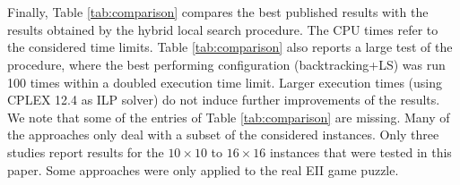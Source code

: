 \documentclass[preprint,12pt]{elsarticle}
\begin{document}
\\
\\
Finally, Table \ref{tab:comparison} compares the best published results with the results obtained by the hybrid local search procedure. 
The CPU times refer to the considered time limits. 
Table \ref{tab:comparison} also reports a large test of the procedure, where the best performing configuration (backtracking+LS) was run 100 times within a doubled execution time limit. Larger execution times (using CPLEX 12.4 as ILP solver)
do not induce further improvements of the results. 
We note that some of the entries of Table \ref{tab:comparison} are missing. Many of the approaches only deal with a subset of the considered instances.
Only three studies \cite{CCCHSO10,WC10,WVV12} report results for the $10\times 10$ to $16\times 16$ instances that were tested in this paper.
Some approaches \cite{SD08,MGS09,VE08} were only applied to the real EII game puzzle.
\end{document}
